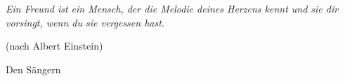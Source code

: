 \thispagestyle{empty}
\begin{center}
 \emph{Ein Freund ist ein Mensch, der die Melodie deines Herzens kennt und sie
       dir vorsingt, wenn du sie vergessen hast.}
 \begin{flushright}
 (nach Albert Einstein)
 \end{flushright}
\vspace{1cm} 
 Den Sängern
\end{center}

\cleardoublepage
